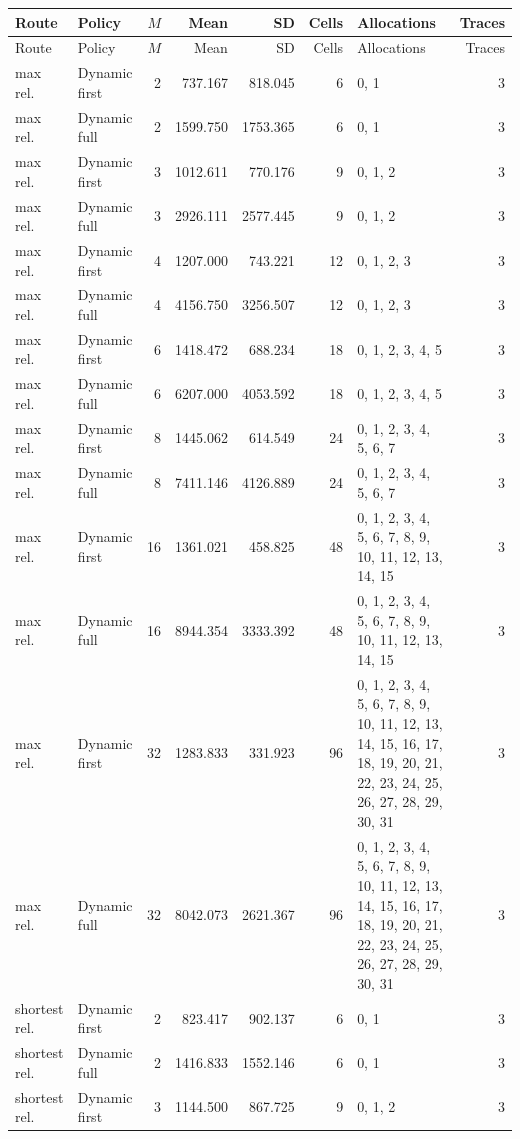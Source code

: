 \documentclass[10pt,a4paper]{article}
\begin{document}
\tiny\setlength{\tabcolsep}{2pt}\begin{longtable}{@{}p{23mm}p{29mm}rrrrp{36mm}r@{}}
\toprule Route & Policy & $M$ & Mean & SD & Cells & Allocations & Traces \\ \midrule\endfirsthead
\toprule Route & Policy & $M$ & Mean & SD & Cells & Allocations & Traces \\ \midrule\endhead
\bottomrule\endfoot
max rel. & Dynamic first & 2 & 737.167 & 818.045 & 6 & 0, 1 & 3 \\
max rel. & Dynamic full & 2 & 1599.750 & 1753.365 & 6 & 0, 1 & 3 \\
max rel. & Dynamic first & 3 & 1012.611 & 770.176 & 9 & 0, 1, 2 & 3 \\
max rel. & Dynamic full & 3 & 2926.111 & 2577.445 & 9 & 0, 1, 2 & 3 \\
max rel. & Dynamic first & 4 & 1207.000 & 743.221 & 12 & 0, 1, 2, 3 & 3 \\
max rel. & Dynamic full & 4 & 4156.750 & 3256.507 & 12 & 0, 1, 2, 3 & 3 \\
max rel. & Dynamic first & 6 & 1418.472 & 688.234 & 18 & 0, 1, 2, 3, 4, 5 & 3 \\
max rel. & Dynamic full & 6 & 6207.000 & 4053.592 & 18 & 0, 1, 2, 3, 4, 5 & 3 \\
max rel. & Dynamic first & 8 & 1445.062 & 614.549 & 24 & 0, 1, 2, 3, 4, 5, 6, 7 & 3 \\
max rel. & Dynamic full & 8 & 7411.146 & 4126.889 & 24 & 0, 1, 2, 3, 4, 5, 6, 7 & 3 \\
max rel. & Dynamic first & 16 & 1361.021 & 458.825 & 48 & 0, 1, 2, 3, 4, 5, 6, 7, 8, 9, 10, 11, 12, 13, 14, 15 & 3 \\
max rel. & Dynamic full & 16 & 8944.354 & 3333.392 & 48 & 0, 1, 2, 3, 4, 5, 6, 7, 8, 9, 10, 11, 12, 13, 14, 15 & 3 \\
max rel. & Dynamic first & 32 & 1283.833 & 331.923 & 96 & 0, 1, 2, 3, 4, 5, 6, 7, 8, 9, 10, 11, 12, 13, 14, 15, 16, 17, 18, 19, 20, 21, 22, 23, 24, 25, 26, 27, 28, 29, 30, 31 & 3 \\
max rel. & Dynamic full & 32 & 8042.073 & 2621.367 & 96 & 0, 1, 2, 3, 4, 5, 6, 7, 8, 9, 10, 11, 12, 13, 14, 15, 16, 17, 18, 19, 20, 21, 22, 23, 24, 25, 26, 27, 28, 29, 30, 31 & 3 \\
shortest rel. & Dynamic first & 2 & 823.417 & 902.137 & 6 & 0, 1 & 3 \\
shortest rel. & Dynamic full & 2 & 1416.833 & 1552.146 & 6 & 0, 1 & 3 \\
shortest rel. & Dynamic first & 3 & 1144.500 & 867.725 & 9 & 0, 1, 2 & 3 \\

\end{longtable}
\end{document}
